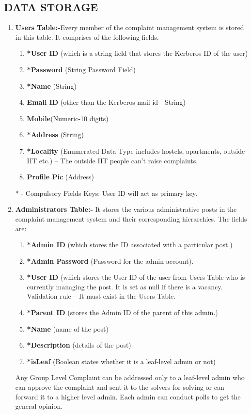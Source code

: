 \documentclass{article}
\begin{document}
\begin{itemize}
\section{DATA STORAGE}
\begin{enumerate}
\item \textbf{Users Table:-}Every member of the complaint management system is stored in this table. It comprises of the following fields.
\begin{enumerate}
\item \textbf{*User ID} (which is a string field that stores the Kerberos ID of the user)
\item \textbf{*Password} (String Password Field)
\item \textbf{*Name} (String)
\item \textbf{Email ID} (other than the Kerberos mail id - String)
\item \textbf{Mobile}(Numeric-10 digits)
\item \textbf{*Address} (String)
\item \textbf{*Locality} (Enumerated Data Type includes hostels, apartments, outside IIT etc.) – The outside IIT people can’t raise complaints.
\item \textbf{Profile Pic} (Address)
\end{enumerate}
* - Compulsory Fields
Keys: User ID will act as primary key.
\item \textbf{Administrators Table:-} It stores the various administrative posts in the complaint management system and their corresponding hierarchies. The fields are:
\begin{enumerate}
\item \textbf{*Admin ID} (which stores the ID associated with a particular post.)
\item \textbf{*Admin Password} (Password for the admin account).
\item \textbf{*User ID} (which stores the User ID of the user from Users Table who is currently managing the post. It is set as null if there is a vacancy. Validation rule – It must exist in the Users Table.
\item \textbf{*Parent ID} (stores the Admin ID of the parent of this admin.)
\item \textbf{*Name} (name of the post)
\item \textbf{*Description} (details of the post)
\item \textbf{*isLeaf} (Boolean states whether it is a leaf-level admin or not)
 \end{enumerate}
 Any Group Level Complaint can be addressed only to a leaf-level admin who can approve the complaint and sent it to the solvers for solving or can forward it to a higher level admin. Each admin can conduct polls to get the general opinion.


\end{enumerate}
\end{itemize}
\end{document}
